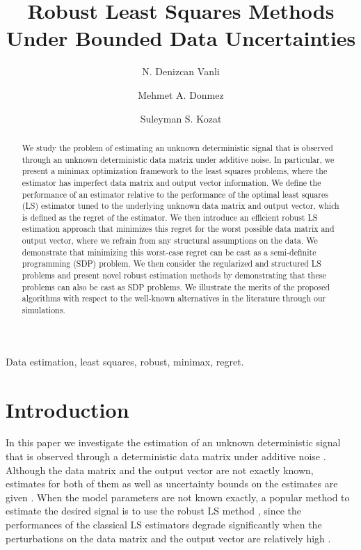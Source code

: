 \documentclass[review,sort&compress]{elsarticle}
\begin{document}
\begin{frontmatter}

\title{Robust Least Squares Methods Under Bounded Data Uncertainties}

\author[1]{N. Denizcan Vanli}
\author[2]{Mehmet A. Donmez}
\author[1]{Suleyman S. Kozat}
\address[1]{Department of Electrical and Electronics Engineering, Bilkent University, Ankara, Tel: +90-312-290-2336.}
\address[2]{Department of Electrical and Computer Engineering, University of Illinois at Urbana-Champaign, Illinois.}

\begin{abstract}
  We study the problem of estimating an unknown deterministic signal that is observed through an unknown deterministic data matrix under additive noise. In particular, we present a minimax optimization framework to the least squares problems, where the estimator has imperfect data matrix and output vector information. We define the performance of an estimator relative to the performance of the optimal least squares (LS) estimator tuned to the underlying unknown data matrix and output vector, which is defined as the regret of the estimator. We then introduce an efficient robust LS estimation approach that minimizes this regret for the worst possible data matrix and output vector, where we refrain from any structural assumptions on the data. We demonstrate that minimizing this worst-case regret can be cast as a semi-definite programming (SDP) problem. We then consider the regularized and structured LS problems and present novel robust estimation methods by demonstrating that these problems can also be cast as SDP problems. We illustrate the merits of the proposed algorithms with respect to the well-known alternatives in the literature through our simulations.
\end{abstract}
\begin{keyword}
  Data estimation, least squares, robust, minimax, regret.
\end{keyword}
\end{frontmatter}

\section{Introduction}
In this paper we investigate the estimation of an unknown deterministic signal that is observed through a deterministic data matrix under additive noise \cite{kuruoglu1,donmez,dsp1,dsp2,dsp3,dsp4,kuruoglu2,kalantarova,Ghaoui97,Kailath:book,yonina,sayedchandra1,sayedchandra2,sayedchandra3}. Although the data matrix and the output vector are not exactly known, estimates for both of them as well as uncertainty bounds on the estimates are given \cite{pilanci10,sayed02,donmez,kalantarova,yonina2,yonina4}. When the model parameters are not known exactly, a popular method to estimate the desired signal is to use the robust LS method \cite{Ghaoui97}, since the performances of the classical LS estimators degrade significantly when the perturbations on the data matrix and the output vector are relatively high \cite{Ghaoui97,sayed02,pilanci10,kuruoglu3,schubert,huber1}.
\end{document}
